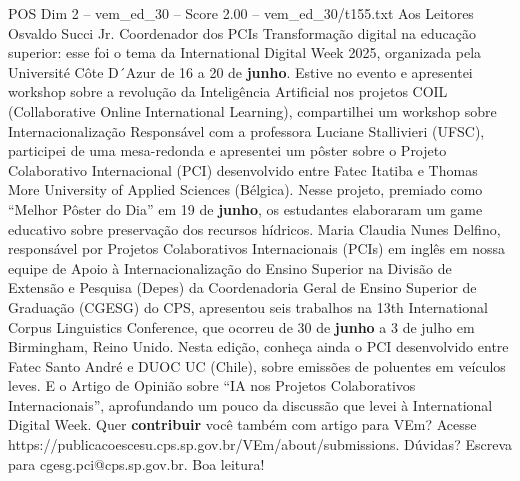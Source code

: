 \begin{textsample}{POS Dim 2 – vem\_ed\_30 – Score 2.00 – vem\_ed\_30/t155.txt}  \label{ex:f2_pos_152}
Aos Leitores Osvaldo Succi Jr.
Coordenador dos PCIs Transformação digital na educação superior: esse foi o tema da International Digital Week 2025, organizada pela Université Côte D´Azur de 16 a 20 de \textbf{junho}.
Estive no evento e apresentei workshop sobre a revolução da Inteligência Artificial nos projetos COIL (Collaborative Online International Learning), compartilhei um workshop sobre Internacionalização Responsável com a professora Luciane Stallivieri (UFSC), participei de uma mesa-redonda e apresentei um pôster sobre o Projeto Colaborativo Internacional (PCI) desenvolvido entre Fatec Itatiba e Thomas More University of Applied Sciences (Bélgica).
Nesse projeto, premiado como “Melhor Pôster do Dia” em 19 de \textbf{junho}, os estudantes elaboraram um game educativo sobre preservação dos recursos hídricos.
Maria Claudia Nunes Delfino, responsável por Projetos Colaborativos Internacionais (PCIs) em inglês em nossa equipe de Apoio à Internacionalização do Ensino Superior na Divisão de Extensão e Pesquisa (Depes) da Coordenadoria Geral de Ensino Superior de Graduação (CGESG) do CPS, apresentou seis trabalhos na 13th International Corpus Linguistics Conference, que ocorreu de 30 de \textbf{junho} a 3 de julho em Birmingham, Reino Unido.
Nesta edição, conheça ainda o PCI desenvolvido entre Fatec Santo André e DUOC UC (Chile), sobre emissões de poluentes em veículos leves.
E o Artigo de Opinião sobre “IA nos Projetos Colaborativos Internacionais”, aprofundando um pouco da discussão que levei à International Digital Week.
Quer \textbf{contribuir} você também com artigo para VEm?
Acesse https://publicacoescesu.cps.sp.gov.br/VEm/about/submissions.
Dúvidas?
Escreva para cgesg.pci@cps.sp.gov.br.
Boa leitura!

\end{textsample}
